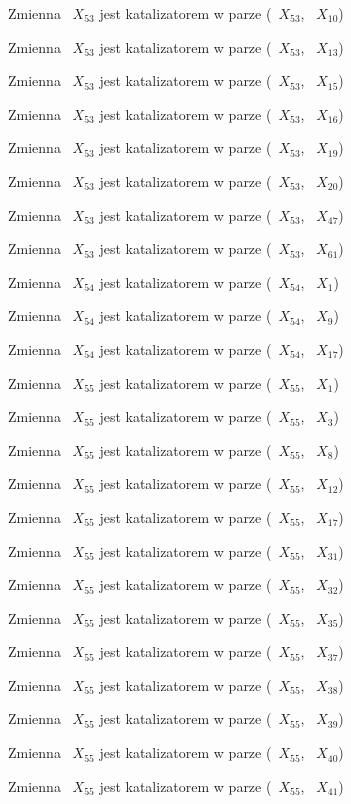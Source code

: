 \documentclass{article}
\begin{document}
Zmienna ~$X_{53}$ jest katalizatorem w parze (~$X_{53}$, ~$X_{10}$)

Zmienna ~$X_{53}$ jest katalizatorem w parze (~$X_{53}$, ~$X_{13}$)

Zmienna ~$X_{53}$ jest katalizatorem w parze (~$X_{53}$, ~$X_{15}$)

Zmienna ~$X_{53}$ jest katalizatorem w parze (~$X_{53}$, ~$X_{16}$)

Zmienna ~$X_{53}$ jest katalizatorem w parze (~$X_{53}$, ~$X_{19}$)

Zmienna ~$X_{53}$ jest katalizatorem w parze (~$X_{53}$, ~$X_{20}$)

Zmienna ~$X_{53}$ jest katalizatorem w parze (~$X_{53}$, ~$X_{47}$)

Zmienna ~$X_{53}$ jest katalizatorem w parze (~$X_{53}$, ~$X_{61}$)

Zmienna ~$X_{54}$ jest katalizatorem w parze (~$X_{54}$, ~$X_{1}$)

Zmienna ~$X_{54}$ jest katalizatorem w parze (~$X_{54}$, ~$X_{9}$)

Zmienna ~$X_{54}$ jest katalizatorem w parze (~$X_{54}$, ~$X_{17}$)

Zmienna ~$X_{55}$ jest katalizatorem w parze (~$X_{55}$, ~$X_{1}$)

Zmienna ~$X_{55}$ jest katalizatorem w parze (~$X_{55}$, ~$X_{3}$)

Zmienna ~$X_{55}$ jest katalizatorem w parze (~$X_{55}$, ~$X_{8}$)

Zmienna ~$X_{55}$ jest katalizatorem w parze (~$X_{55}$, ~$X_{12}$)

Zmienna ~$X_{55}$ jest katalizatorem w parze (~$X_{55}$, ~$X_{17}$)

Zmienna ~$X_{55}$ jest katalizatorem w parze (~$X_{55}$, ~$X_{31}$)

Zmienna ~$X_{55}$ jest katalizatorem w parze (~$X_{55}$, ~$X_{32}$)

Zmienna ~$X_{55}$ jest katalizatorem w parze (~$X_{55}$, ~$X_{35}$)

Zmienna ~$X_{55}$ jest katalizatorem w parze (~$X_{55}$, ~$X_{37}$)

Zmienna ~$X_{55}$ jest katalizatorem w parze (~$X_{55}$, ~$X_{38}$)

Zmienna ~$X_{55}$ jest katalizatorem w parze (~$X_{55}$, ~$X_{39}$)

Zmienna ~$X_{55}$ jest katalizatorem w parze (~$X_{55}$, ~$X_{40}$)

Zmienna ~$X_{55}$ jest katalizatorem w parze (~$X_{55}$, ~$X_{41}$)
\end{document}
